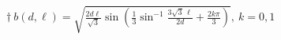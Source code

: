 \documentclass{article}
\begin{document}
\begin{center}
\section*{}
\noindent{}
\Large{
$\dagger\ b(d,\ell) =\sqrt{\frac{2d\ell}{\sqrt{3}} \sin
  \left(
    \frac{1}{3} \sin^{-1} \frac{3\sqrt{3}\, \ell}{2d}+\frac{2k\pi}{3}
  \right)},\ k=0,1$}
\newpage


\end{center}
\end{document}
